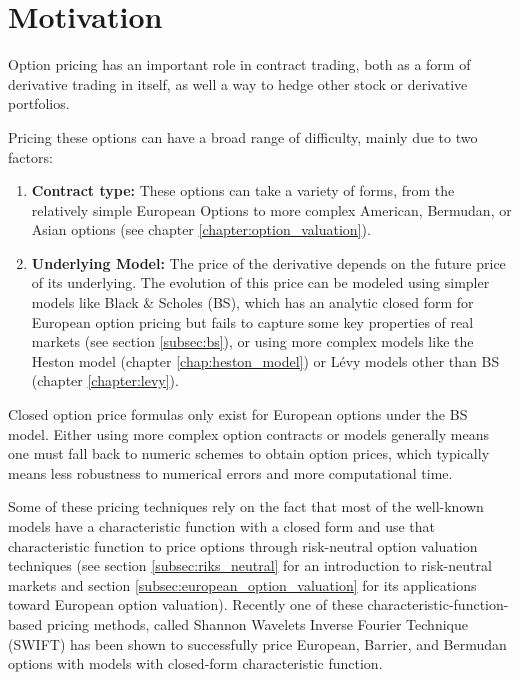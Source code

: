 \documentclass[12,twoside]{mammeTFM}
\theoremstyle{definition}
\theoremstyle{remark}
\begin{document}
\maketitle

\tableofcontents

\pagebreak


\section{Motivation}

Option pricing has an important role in contract trading, both as a form of derivative trading in itself, as well a way to hedge other stock or derivative portfolios.

Pricing these options can have a broad range of difficulty, mainly due to two factors:
\begin{enumerate}
\item \textbf{Contract type:} These options can take a variety of forms, from the relatively simple European Options to more complex American, Bermudan, or Asian options (see chapter \ref{chapter:option_valuation}).
\item \textbf{Underlying Model: } The price of the derivative depends on the future price of its underlying. The evolution of this price can be modeled using simpler models like Black \& Scholes (BS), which has an analytic closed form for European option pricing but fails to capture some key properties of real markets (see section \ref{subsec:bs}), or using more complex models like the Heston model (chapter \ref{chap:heston_model}) or L\'evy models other than BS (chapter \ref{chapter:levy}).
\end{enumerate}

Closed option price formulas only exist for European options under the BS model. Either using more complex option contracts or models generally means one must fall back to numeric schemes to obtain option prices, which typically means less robustness to numerical errors and more computational time.

Some of these pricing techniques rely on the fact that most of the well-known models have a characteristic function with a closed form and use that characteristic function to price options through risk-neutral option valuation techniques (see section \ref{subsec:riks_neutral} for an introduction to risk-neutral markets and section \ref{subsec:european_option_valuation} for its applications toward European option valuation). Recently one of these characteristic-function-based pricing methods, called Shannon Wavelets Inverse Fourier Technique (SWIFT) \cite{Ortiz-Gracia2016} has been shown to successfully price European, Barrier, and Bermudan options \cite{mar17} with models with closed-form characteristic function.
\end{document}
